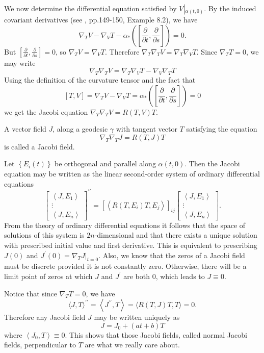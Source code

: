 \documentclass{ctexart}
\begin{document}
We now determine the differential equation satisfied by $V \left|_{\alpha(t, 0)}\right.$. By the induced covariant derivatives (see \cite{ChenWeiHuan2002}, pp.149-150, Example 8.2), we have
$$
\nabla_T V-\nabla_V T-\alpha_*\left(\left[\frac{\partial}{\partial t}, \frac{\partial}{\partial s}\right]\right)=0 .
$$
But $\left[\frac{\partial}{\partial t}, \frac{\partial}{\partial s}\right]=0$, so $\nabla_T V=\nabla_V T$. Therefore $\nabla_T \nabla_T V=\nabla_T \nabla_V T$. Since $\nabla_T T=0$, we may write
$$
\nabla_T \nabla_T V=\nabla_T \nabla_V T-\nabla_V \nabla_T T
$$
Using the definition of the curvature tensor and the fact that
$$
[T, V]=\nabla_T V-\nabla_V T=\alpha_*\left(\left[\frac{\partial}{\partial t}, \frac{\partial}{\partial s}\right]\right)=0
$$
we get the Jacobi equation $\nabla_T \nabla_T V=R(T, V) T.$
\begin{definition}
  A vector field $J$, along a geodesic $\gamma$ with tangent vector $T$ satisfying the equation 
  $$
  \nabla_T \nabla_T J=R(T, J) T
  $$
  is called a Jacobi field. 
\end{definition}
Let $\left\{E_i(t)\right\}$ be orthogonal and parallel along $\alpha(t, 0)$. Then the Jacobi equation may be written as the linear second-order system of ordinary differential equations
$$
\left[\begin{array}{c}
\left\langle J, E_1\right\rangle \\
\vdots \\
\left\langle J, E_n\right\rangle
\end{array}\right]^{\prime \prime}=\left[\left\langle R\left(T, E_i\right) T, E_j\right\rangle \right]_{i j}
\left[\begin{array}{c}
\left\langle J, E_1\right\rangle \\
\vdots \\
\left\langle J, E_n\right\rangle
\end{array}\right].
$$
From the theory of ordinary differential equations it follows that the space of solutions of this system is $2 n$-dimensional and that there exists a unique solution with prescribed initial value and first derivative. This is equivalent to prescribing $J(0)$ and $J^{\prime}(0)=\left.\nabla_T J\right|_{t=0}$. 
Also, we know that the zeros of a Jacobi field must be discrete provided it is not constantly zero. Otherwise, there will be a limit point of zeros at which $J$ and $J^\prime$ are both $0$, which leads to $J\equiv 0$.

Notice that since $\nabla_T T=0$, we have
$$
\langle J, T\rangle^{\prime \prime}=\left\langle J^{\prime \prime}, T\right\rangle=\langle R(T, J) T, T\rangle=0 .
$$
Therefore any Jacobi field $J$ may be written uniquely as
$$
J=J_0+(a t+b) T
$$
where $\left\langle J_0, T\right\rangle \equiv 0$. This shows that those Jacobi fields, called normal Jacobi fields, perpendicular to $T$ are what we really care about. 
\end{document}
